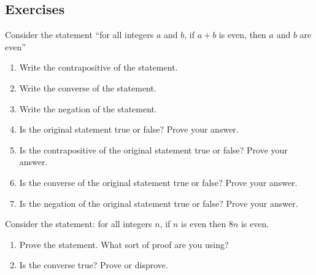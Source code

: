 \documentclass[10pt,]{book}
\theoremstyle{plain}
\theoremstyle{definition}
\theoremstyle{definition}
\theoremstyle{definition}
\theoremstyle{definition}
\numberwithin{equation}{chapter}
\begin{document}
\typeout{************************************************}
\typeout{************************************************}
\subsection*{Exercises}\label{exercises_logic-proofs}
\begin{divisionexercise}{1}\hypertarget{exercise-236}{}
\hypertarget{p-2000}{}%
Consider the statement ``for all integers \(a\) and \(b\), if \(a + b\) is even, then \(a\) and \(b\) are even''%
\par
\hypertarget{p-2001}{}%
\leavevmode%
\begin{enumerate}[label=(\alph*)]
\item\hypertarget{li-684}{}\hypertarget{p-2002}{}%
Write the contrapositive of the statement.%
\item\hypertarget{li-685}{}\hypertarget{p-2003}{}%
Write the converse of the statement.%
\item\hypertarget{li-686}{}\hypertarget{p-2004}{}%
Write the negation of the statement.%
\item\hypertarget{li-687}{}\hypertarget{p-2005}{}%
Is the original statement true or false? Prove your answer.%
\item\hypertarget{li-688}{}\hypertarget{p-2006}{}%
Is the contrapositive of the original statement true or false? Prove your answer.%
\item\hypertarget{li-689}{}\hypertarget{p-2007}{}%
Is the converse of the original statement true or false? Prove your answer.%
\item\hypertarget{li-690}{}\hypertarget{p-2008}{}%
Is the negation of the original statement true or false? Prove your answer.%
\end{enumerate}
%
\end{divisionexercise}%
\begin{divisionexercise}{2}\hypertarget{exercise-237}{}
\hypertarget{p-2017}{}%
Consider the statement: for all integers \(n\), if \(n\) is even then \(8n\) is even.%
\par
\hypertarget{p-2018}{}%
\leavevmode%
\begin{enumerate}[label=(\alph*)]
\item\hypertarget{li-698}{}\hypertarget{p-2019}{}%
Prove the statement. What sort of proof are you using?%
\item\hypertarget{li-699}{}\hypertarget{p-2020}{}%
Is the converse true? Prove or disprove.%
\end{enumerate}
%
\end{divisionexercise}%
\end{document}
